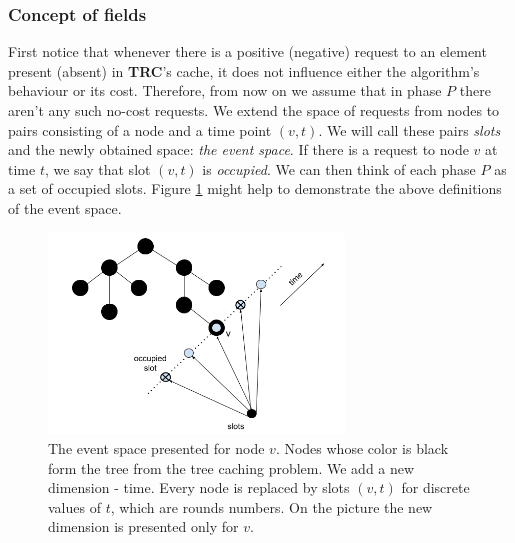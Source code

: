 \subsubsection{Concept of fields} First notice that whenever there is a
positive (negative) request to an element present (absent) in \textbf{TRC}'s cache,
it does not influence either the algorithm's behaviour or its cost. Therefore,
from now on we assume that in phase $P$ there aren't any such no-cost
requests. We extend the space of requests from nodes to pairs consisting of a node
and a time point $(v, t)$. We will call these pairs \textit{slots} and the newly
obtained space: \textit{the event space}. If there is a request to node $v$ at
time $t$, we say that slot $(v, t)$ is \textit{occupied}. We can then think of
each phase $P$ as a set of occupied slots. Figure \ref{fig:spacial_temporal}
might help to demonstrate the above definitions of the event space.
\begin{figure} \begin{center}
\includegraphics[width=0.7\textwidth]{spacial_temporal.png} \end{center}
\caption{The event space presented for node $v$. Nodes whose color is black form the
tree from the tree caching problem. We add a new dimension - time. Every node is
replaced by slots $(v, t)$ for discrete values of $t$, which are rounds numbers.
On the picture the new dimension is presented only for $v$.}
\label{fig:spacial_temporal} \end{figure}

